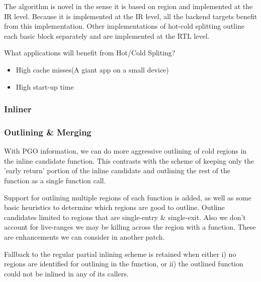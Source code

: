 The algorithm is novel in the sense it is based on region and implemented at the IR level. Because it is implemented at the IR level, all the backend targets benefit from this implementation. Other implementations of hot-cold splitting outline each basic block separately and are implemented at the RTL level.


What applications will benefit from Hot/Cold Spliting?

\begin{itemize}

\item High cache misses(A giant app on a small device)
\item High start-up time

\end{itemize}


\subsubsection{Inliner}



\subsubsection{Outlining \& Merging}

With PGO information, we can do more aggressive outlining of cold regions in the inline candidate function. This contrasts with the scheme of keeping only the 'early return' portion of the inline candidate and outlining the rest of the function as a single function call.

Support for outlining multiple regions of each function is added, as well as some basic heuristics to determine which regions are good to outline. Outline candidates limited to regions that are single-entry \& single-exit. Also we don't account for live-ranges we may be killing across the region with a function. These are enhancements we can consider in another patch.

Fallback to the regular partial inlining scheme is retained when either i) no regions are identified for outlining in the function, or ii) the outlined function could not be inlined in any of its callers.



